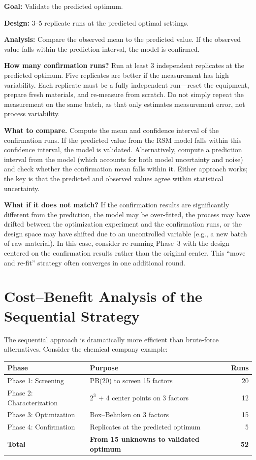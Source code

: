 \documentclass[11pt]{book}
\begin{document}
\textbf{Goal:} Validate the predicted optimum.

\textbf{Design:} 3--5 replicate runs at the predicted optimal settings.

\textbf{Analysis:} Compare the observed mean to the predicted value. If the
observed value falls within the prediction interval, the model is confirmed.

\medskip
\noindent\textbf{How many confirmation runs?}
Run at least 3 independent replicates at the predicted optimum. Five replicates
are better if the measurement has high variability. Each replicate must be a
fully independent run---reset the equipment, prepare fresh materials, and
re-measure from scratch. Do not simply repeat the measurement on the same
batch, as that only estimates measurement error, not process variability.

\medskip
\noindent\textbf{What to compare.}
Compute the mean and confidence interval of the confirmation runs. If the
predicted value from the RSM model falls within this confidence interval, the
model is validated. Alternatively, compute a prediction interval from the model
(which accounts for both model uncertainty and noise) and check whether the
confirmation mean falls within it. Either approach works; the key is that the
predicted and observed values agree within statistical uncertainty.

\medskip
\noindent\textbf{What if it does not match?}
If the confirmation results are significantly different from the prediction,
the model may be over-fitted, the process may have drifted between the
optimization experiment and the confirmation runs, or the design space may
have shifted due to an uncontrolled variable (e.g., a new batch of raw
material). In this case, consider re-running Phase~3 with the design centered
on the confirmation results rather than the original center. This ``move and
re-fit'' strategy often converges in one additional round.

\section{Cost--Benefit Analysis of the Sequential Strategy}

The sequential approach is dramatically more efficient than brute-force
alternatives. Consider the chemical company example:

\begin{center}
\begin{tabular}{llr}
\toprule
Phase & Purpose & Runs \\
\midrule
Phase 1: Screening & PB(20) to screen 15 factors & 20 \\
Phase 2: Characterization & $2^3$ + 4 center points on 3 factors & 12 \\
Phase 3: Optimization & Box--Behnken on 3 factors & 15 \\
Phase 4: Confirmation & Replicates at the predicted optimum & 5 \\
\midrule
\textbf{Total} & \textbf{From 15 unknowns to validated optimum} & \textbf{52} \\
\bottomrule
\end{tabular}
\end{center}
\end{document}
